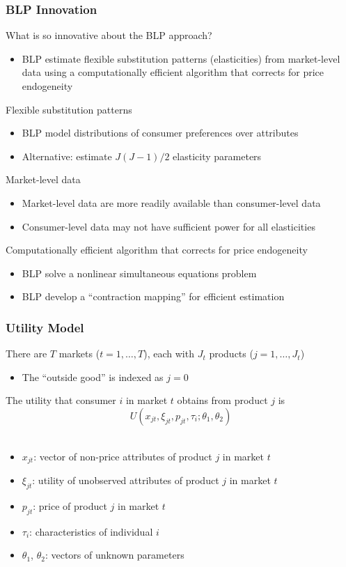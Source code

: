 \documentclass{beamer}
\begin{document}
\begin{frame}\frametitle{BLP Innovation}
    What is so innovative about the BLP approach?
    \begin{itemize}
        \item BLP estimate flexible substitution patterns (elasticities) from market-level data using a computationally efficient algorithm that corrects for price endogeneity
    \end{itemize}
    \vspace{1ex}
    Flexible substitution patterns
    \begin{itemize}
        \item BLP model distributions of consumer preferences over attributes
        \item Alternative: estimate $J (J - 1) / 2$ elasticity parameters
    \end{itemize}
    \vspace{1ex}
    Market-level data
    \begin{itemize}
        \item Market-level data are more readily available than consumer-level data
        \item Consumer-level data may not have sufficient power for all elasticities
    \end{itemize}
    \vspace{1ex}
    Computationally efficient algorithm that corrects for price endogeneity
    \begin{itemize}
        \item BLP solve a nonlinear simultaneous equations problem
        \item BLP develop a ``contraction mapping'' for efficient estimation
    \end{itemize}
\end{frame}

\begin{frame}\frametitle{Utility Model}
    There are $T$ markets ($t = 1, \ldots, T$), each with $J_t$ products ($j = 1, \ldots, J_t$)
    \begin{itemize}
        \item The ``outside good'' is indexed as $j = 0$
    \end{itemize}
    \vspace{2ex}
    The utility that consumer $i$ in market $t$ obtains from product $j$ is
    $$U(x_{jt}, \xi_{jt}, p_{jt}, \tau_i; \theta_1, \theta_2)$$ \\
    \vspace{-1ex}
    \begin{itemize}
        \item $x_{jt}$: vector of non-price attributes of product $j$ in market $t$
        \item $\xi_{jt}$: utility of unobserved attributes of product $j$ in market $t$
        \item $p_{jt}$: price of product $j$ in market $t$
        \item $\tau_i$: characteristics of individual $i$
        \item $\theta_1$, $\theta_2$: vectors of unknown parameters
    \end{itemize}
\end{frame}
\end{document}
